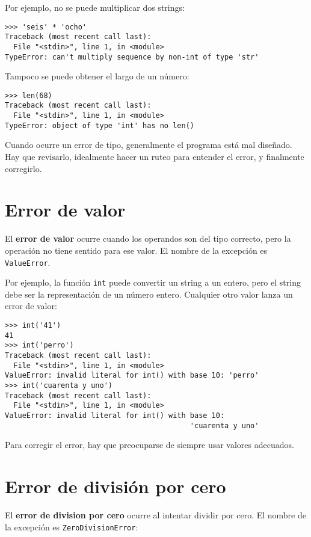 Por ejemplo, no se puede multiplicar dos strings:

\begin{lstlisting}[language={}]
>>> 'seis' * 'ocho'
Traceback (most recent call last):
  File "<stdin>", line 1, in <module>
TypeError: can't multiply sequence by non-int of type 'str'
\end{lstlisting}

Tampoco se puede obtener el largo de un número:

\begin{lstlisting}[language={}]
>>> len(68)
Traceback (most recent call last):
  File "<stdin>", line 1, in <module>
TypeError: object of type 'int' has no len()
\end{lstlisting}

Cuando ocurre un error de tipo, generalmente el programa está mal
diseñado. Hay que revisarlo, idealmente hacer un ruteo para entender el
error, y finalmente corregirlo.

\section{Error de valor}

El \textbf{error de valor} ocurre cuando los operandos son del tipo
correcto, pero la operación no tiene sentido para ese valor.
El nombre de la excepción es \lstinline!ValueError!.

Por ejemplo, la función \lstinline!int! puede convertir un string a un
entero, pero el string debe ser la representación de un número entero.
Cualquier otro valor lanza un error de valor:

\begin{lstlisting}[language={}]
>>> int('41')
41
>>> int('perro')
Traceback (most recent call last):
  File "<stdin>", line 1, in <module>
ValueError: invalid literal for int() with base 10: 'perro'
>>> int('cuarenta y uno')
Traceback (most recent call last):
  File "<stdin>", line 1, in <module>
ValueError: invalid literal for int() with base 10:
                                           'cuarenta y uno'
\end{lstlisting}

Para corregir el error, hay que preocuparse de siempre usar valores
adecuados.

\section{Error de división por cero}

El \textbf{error de division por cero} ocurre al intentar dividir por cero.
El nombre de la excepción es \lstinline!ZeroDivisionError!:


